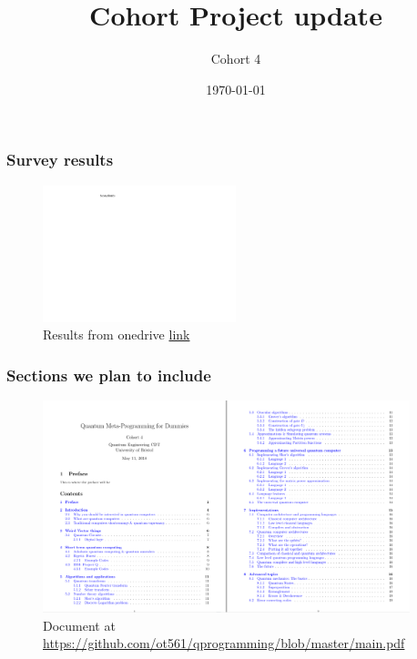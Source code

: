 \documentclass{beamer}
\title{Cohort Project update}
\author{Cohort 4}
\institute{Quantum Engineering CDT \\ University of Bristol}
\date{\today}
\begin{document}
\frame{\titlepage}

\begin{frame}
\frametitle{Survey results}
\begin{figure}[H]
	\centering
	\includegraphics[width=0.5\textwidth]{survey.pdf}
	\caption{Results from onedrive \url{link}}
	\label{}
\end{figure}
\end{frame}

\begin{frame}
\frametitle{Sections we plan to include}
\begin{figure}[H]
	\centering
	\includegraphics[width=0.95\textwidth]{cohortprojcontents.png}
	\caption{Document at \url{https://github.com/ot561/qprogramming/blob/master/main.pdf}}
	\label{}
\end{figure}
\end{frame}
\end{document}
